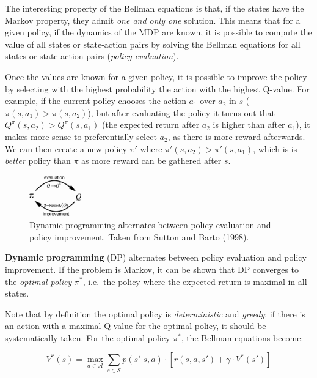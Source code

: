 \documentclass[
  letterpaper,
  DIV=11,
  numbers=noendperiod]{scrreprt}
\begin{document}
The interesting property of the Bellman equations is that, if the states
have the Markov property, they admit \emph{one and only one} solution.
This means that for a given policy, if the dynamics of the MDP are
known, it is possible to compute the value of all states or state-action
pairs by solving the Bellman equations for all states or state-action
pairs (\emph{policy evaluation}).

Once the values are known for a given policy, it is possible to improve
the policy by selecting with the highest probability the action with the
highest Q-value. For example, if the current policy chooses the action
\(a_1\) over \(a_2\) in \(s\) (\(\pi(s, a_1) > \pi(s, a_2)\)), but after
evaluating the policy it turns out that
\(Q^\pi(s, a_2) > Q^\pi(s, a_1)\) (the expected return after \(a_2\) is
higher than after \(a_1\)), it makes more sense to preferentially select
\(a_2\), as there is more reward afterwards. We can then create a new
policy \(\pi'\) where \(\pi'(s, a_2) > \pi'(s, a_1)\), which is is
\emph{better} policy than \(\pi\) as more reward can be gathered after
\(s\).

\begin{figure}

{\centering \includegraphics[width=0.2\textwidth,height=\textheight]{./img/dynamicprogramming.png}

}

\caption{\label{fig-dynamicprogramming}Dynamic programming alternates
between policy evaluation and policy improvement. Taken from Sutton and
Barto (1998).}

\end{figure}

\textbf{Dynamic programming} (DP) alternates between policy evaluation
and policy improvement. If the problem is Markov, it can be shown that
DP converges to the \emph{optimal policy} \(\pi^*\), i.e.~the policy
where the expected return is maximal in all states.

Note that by definition the optimal policy is \emph{deterministic} and
\emph{greedy}: if there is an action with a maximal Q-value for the
optimal policy, it should be systematically taken. For the optimal
policy \(\pi^*\), the Bellman equations become:

\[
    V^{*}(s) = \max_{a \in \mathcal{A}} \sum_{s \in \mathcal{S}} p(s' | s, a) \cdot [ r(s, a, s') + \gamma \cdot V^{*} (s') ]
\]
\end{document}
